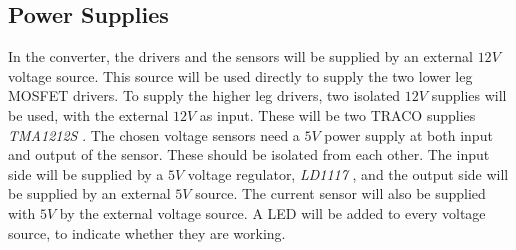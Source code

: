 \subsection{Power Supplies}\label{power_supplies}
In the converter, the drivers and the sensors will be supplied by an external $12V$ voltage source. This source will be used directly to supply the two lower leg MOSFET drivers. To supply the higher leg drivers, two isolated $12V$ supplies will be used, with the external $12V$ as input. These will be two TRACO supplies \textit{TMA1212S} \cite{traco_tma1212}. The chosen voltage sensors need a $5V$ power supply at both input and output of the sensor. These should be isolated from each other. The input side will be supplied by a $5V$ voltage regulator, \textit{LD1117} \cite{LD1117}, and the output side will be supplied by an external $5V$ source. The current sensor will also be supplied with $5V$ by the external voltage source. A LED will be added to every voltage source, to indicate whether they are working.